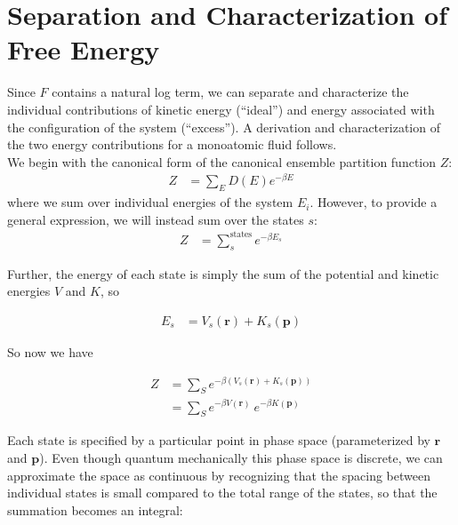\documentclass[12pt]{article}
\newcommand{\ignore}[1]{}
\begin{document}

\section{Separation and Characterization of Free Energy}

Since $F$ contains a natural log term, we can separate and characterize the individual contributions of kinetic energy (``ideal'') and energy associated with the configuration of the system (``excess''). A derivation and characterization of the two energy contributions for a monoatomic fluid follows. \\

\ignore{{\color{red} [This should probably go in an appendix. Further: replace $Z_C$ with $Z_{exc}$; fix the to the N on the $Z_{exc}$ term; include the $N!$ into the ideal term; fix the $V(r_1, r_2, ...)$||| All done! NOW: fix the dimensions on the $Z_{id}$ term!]}}

We begin with the canonical form of the canonical ensemble partition function $Z$:
\begin{align}
    Z &= \sum_E D(E) e^{-\beta E}
\end{align}
where we sum over individual energies of the system $E_i$. However, to provide a general expression, we will instead sum over the states $s$:
\begin{align}
    Z &= \sum_s^{\text{states}} e^{-\beta E_s}
\end{align} 

Further, the energy of each state is simply the sum of the potential and kinetic energies $V$ and $K$, so

\begin{align}
    E_s &= V_s(\mathbf{r}) + K_s(\mathbf{p})
\end{align}

So now we have 

\begin{align}
    Z &= \sum_S e^{-\beta (V_s(\mathbf{r}) + K_s(\mathbf{p}))}\\
    &= \sum_S e^{-\beta V(\mathbf{r})}~e^{-\beta K(\mathbf{p})}
\end{align} 

Each state is specified by a particular point in phase space (parameterized by $\mathbf{r}$ and $\mathbf{p}$). Even though quantum mechanically this phase space is discrete, we can approximate the space as continuous by recognizing that the spacing between individual states is small compared to the total range of the states, so that the summation becomes an integral:
\end{document}
